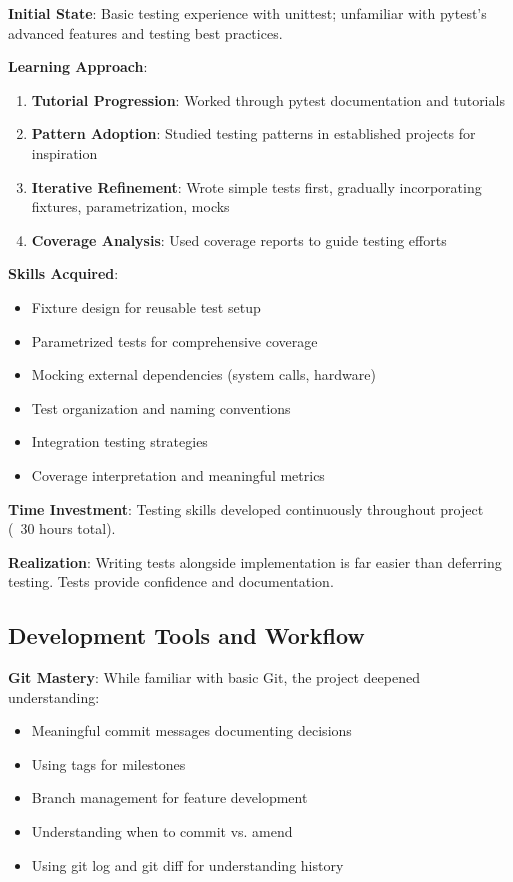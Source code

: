 \documentclass[12pt,a4paper,oneside]{report}
\begin{document}
\textbf{Initial State}: Basic testing experience with unittest; unfamiliar with pytest's advanced features and testing best practices.

\textbf{Learning Approach}:

\begin{enumerate}
    \item \textbf{Tutorial Progression}: Worked through pytest documentation and tutorials
    \item \textbf{Pattern Adoption}: Studied testing patterns in established projects for inspiration
    \item \textbf{Iterative Refinement}: Wrote simple tests first, gradually incorporating fixtures, parametrization, mocks
    \item \textbf{Coverage Analysis}: Used coverage reports to guide testing efforts
\end{enumerate}

\textbf{Skills Acquired}:
\begin{itemize}
    \item Fixture design for reusable test setup
    \item Parametrized tests for comprehensive coverage
    \item Mocking external dependencies (system calls, hardware)
    \item Test organization and naming conventions
    \item Integration testing strategies
    \item Coverage interpretation and meaningful metrics
\end{itemize}

\textbf{Time Investment}: Testing skills developed continuously throughout project (~30 hours total).

\textbf{Realization}: Writing tests alongside implementation is far easier than deferring testing. Tests provide confidence and documentation.

\subsection{Development Tools and Workflow}

\textbf{Git Mastery}: While familiar with basic Git, the project deepened understanding:
\begin{itemize}
    \item Meaningful commit messages documenting decisions
    \item Using tags for milestones
    \item Branch management for feature development
    \item Understanding when to commit vs. amend
    \item Using git log and git diff for understanding history
\end{itemize}
\end{document}
